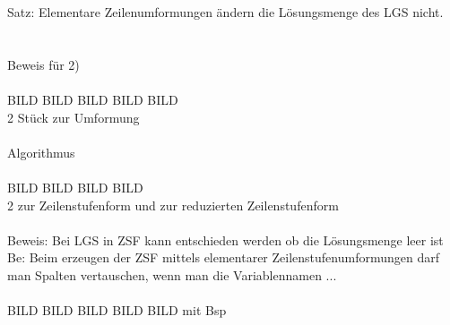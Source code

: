 \documentclass{scrartcl}
\begin{document}
	Satz: Elementare Zeilenumformungen ändern die Lösungsmenge des LGS nicht.
	\\
	\\
	\\
	Beweis für 2)
	\\
	\\
	BILD BILD BILD BILD BILD\\
	2 Stück zur Umformung
	\\
	\\
	Algorithmus
	\\
	\\
	BILD BILD BILD BILD\\
	2 zur Zeilenstufenform und zur reduzierten Zeilenstufenform
	\\
	\\
	Beweis: Bei LGS in ZSF kann entschieden werden ob die Lösungsmenge leer ist
	\\
	Be: Beim erzeugen der ZSF mittels elementarer Zeilenstufenumformungen darf man Spalten vertauschen, wenn man die Variablennamen ...
	\\
	\\
	BILD BILD BILD BILD BILD
	mit Bsp
	\\
\end{document}
